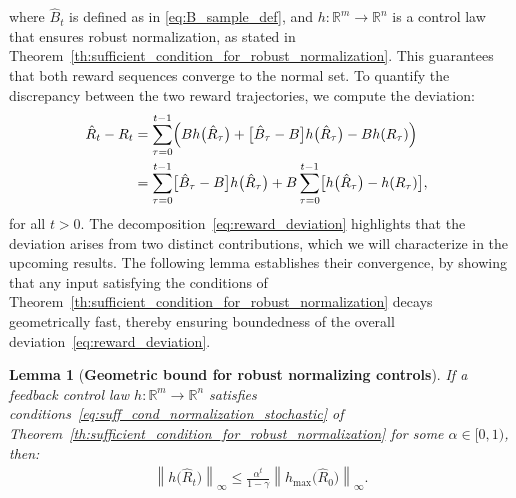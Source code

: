 \documentclass[10pt,leqno]{amsart}
\newcommand{\sml}{\scriptscriptstyle}
\newcommand{\norm}[1]{\left \|#1 \right \|}
\newcommand{\R}{\mathbb{R}}
\newcommand{\Cost}{R}
\newcommand{\disc}{\gamma}
\newcommand{\B}{B}
\newcommand{\infnorm}[1]{\norm{#1}_\infty}
\newcommand{\outmap}{h_{\sml \text{max}}}
\newcommand{\Bapx}{\hat{B}}
\newcommand{\Costpert}{\hat{\Cost}}
\newtheorem{lemma}[theorem]{Lemma}
\begin{document}
where $\Bapx_t$ is defined as in \eqref{eq:B_sample_def}, and $h : \R^m \to \R^n$ is a control law that ensures robust normalization, as stated in Theorem~\ref{th:sufficient_condition_for_robust_normalization}. This guarantees that both reward sequences converge to the normal set. To quantify the discrepancy between the two reward trajectories, we compute the deviation:
\begin{align}
    \hspace{-0.2cm}\Costpert_t - \Cost_t &= \sum_{\tau = 0}^{t - 1} \Bigl( \B h\bigl(\Costpert_\tau\bigr) + \bigl[\Bapx_\tau - \B\bigr] h\bigl(\Costpert_\tau\bigr) - \B h(\Cost_\tau) \Bigr) \notag\\
    &= \sum_{\tau = 0}^{t-1} \bigl[\Bapx_\tau - \B\bigr] h\bigl(\Costpert_\tau\bigr) + \B \sum_{\tau = 0}^{t-1} \bigl[h\bigl(\Costpert_\tau\bigr) - h(\Cost_\tau)\bigr] \label{eq:reward_deviation},
\end{align}
for all $t > 0$. The decomposition~\eqref{eq:reward_deviation} highlights that the deviation arises from two distinct contributions, which we will characterize in the upcoming results. The following lemma establishes their convergence, by showing that any input satisfying the conditions of Theorem~\ref{th:sufficient_condition_for_robust_normalization} decays geometrically fast, thereby ensuring boundedness of the overall deviation~\eqref{eq:reward_deviation}.
\begin{lemma}[\textbf{Geometric bound for robust normalizing controls}]\label{lem:geometric_input_convergence}
    If a feedback control law $h : \R^m \to \R^n$ satisfies conditions~\eqref{eq:suff_cond_normalization_stochastic} of Theorem~\ref{th:sufficient_condition_for_robust_normalization} for some $\alpha \in [0, 1)$, then:
    \begin{align}
        \infnorm{h\bigl(\Costpert_t\bigr)} \leq \frac{\alpha^t}{1 - \disc} \infnorm{\outmap\bigl(\Costpert_0\bigr)}.
    \end{align}
\end{lemma}
\end{document}
